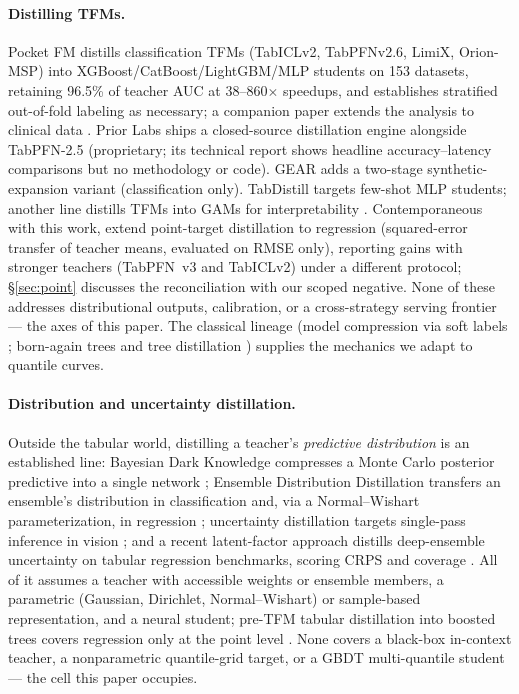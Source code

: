 \documentclass[11pt]{article}
\begin{document}
\paragraph{Distilling TFMs.} Pocket FM \citep{pocketfm2026} distills
classification TFMs (TabICLv2, TabPFNv2.6, LimiX, Orion-MSP) into
XGBoost/CatBoost/LightGBM/MLP students on 153 datasets, retaining
96.5\% of teacher
AUC at 38--860$\times$ speedups, and establishes stratified out-of-fold
labeling as necessary; a companion paper extends the analysis to clinical
data \citep{pocketfmhealth2026}. Prior Labs ships a closed-source
distillation engine alongside TabPFN-2.5 \citep{priorlabs2025} (proprietary; its technical
report shows headline accuracy--latency comparisons but no methodology
or code). GEAR \citep{gear2026} adds a two-stage
synthetic-expansion variant (classification only). TabDistill
\citep{tabdistill2025} targets few-shot MLP students; another line distills
TFMs into GAMs for interpretability \citep{tfmgam2026}. Contemporaneous
with this work, \citet{jeong2026} extend point-target distillation to
regression (squared-error transfer of teacher means, evaluated on RMSE
only), reporting gains with stronger teachers (TabPFN~v3 and TabICLv2)
under a different protocol; \S\ref{sec:point} discusses the reconciliation with
our scoped negative. None of these addresses distributional outputs,
calibration, or a cross-strategy serving frontier --- the axes of this
paper. The classical lineage (model compression via soft labels
\citep{bucila2006,hinton2015}; born-again trees
\citep{breiman1996,vidal2020} and tree distillation \citep{frosst2017})
supplies the mechanics we adapt
to quantile curves.

\paragraph{Distribution and uncertainty distillation.} Outside the
tabular world, distilling a teacher's \emph{predictive distribution} is
an established line: Bayesian Dark Knowledge compresses a Monte Carlo
posterior predictive into a single network \citep{korattikara2015};
Ensemble Distribution Distillation transfers an ensemble's distribution
in classification \citep{malinin2020end2} and, via a Normal--Wishart
parameterization, in regression \citep{malinin2020rpn}; uncertainty
distillation targets single-pass inference in vision \citep{shen2021};
and a recent latent-factor approach distills deep-ensemble uncertainty
on tabular regression benchmarks, scoring CRPS and coverage
\citep{park2025uncertainty}. All of it assumes a teacher with
accessible weights or ensemble members, a parametric (Gaussian,
Dirichlet, Normal--Wishart) or sample-based representation, and a
neural student; pre-TFM tabular distillation into boosted trees covers
regression only at the point level \citep{fakoor2020}. None covers a
black-box in-context teacher, a nonparametric quantile-grid target, or
a GBDT multi-quantile student --- the cell this paper occupies.
\end{document}
